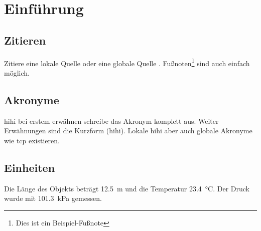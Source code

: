 \section{Einführung}

\subsection{Zitieren}

Zitiere eine lokale Quelle \cite{localref} oder eine globale Quelle \cite{globalref}.
Fußnoten\footnote{Dies ist ein Beispiel-Fußnote} sind auch einfach möglich.

\subsection{Akronyme}

\gls{hihi} bei erstem erwähnen schreibe das Akronym komplett aus.
Weiter Erwähnungen sind die Kurzform (\gls{hihi}).
Lokale \gls{hihi} aber auch globale Akronyme wie \gls{tcp} existieren.

\subsection{Einheiten}

Die Länge des Objekts beträgt \SI{12.5}{\meter} und die Temperatur \SI{23.4}{\celsius}.
Der Druck wurde mit \SI{101.3}{\kilo\pascal} gemessen.
